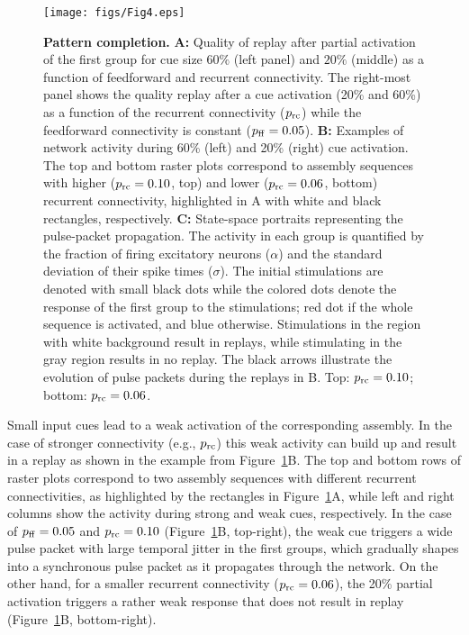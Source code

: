     \begin{figure}[!h]
      \texttt{[image: figs/Fig4.eps]}
      \caption{{\bf Pattern completion.}
        \textbf{A:} Quality of replay after partial activation of the first
        group for cue size $60\%$ (left panel) and $20\%$ (middle) as a
        function of feedforward and recurrent connectivity.  The right-most
        panel shows the quality replay after a cue activation (20\% and 60\%)
        as a function of the recurrent connectivity ($p_{\rm rc}$) while the
        feedforward connectivity is constant ($p_{\rm ff} = 0.05$).
        \textbf{B:} Examples of network activity during 60\% (left) and 20\%
        (right) cue activation.  The top and bottom raster plots correspond to
        assembly sequences with higher ($p_{\rm rc} = 0.10$, top) and lower
        ($p_{\rm rc} = 0.06$, bottom) recurrent connectivity, highlighted in A
        with white and black rectangles, respectively.
        \textbf{C:} State-space portraits representing the pulse-packet
        propagation.  The activity in each group is quantified by the fraction
        of firing excitatory neurons ($\alpha$) and the standard deviation of
        their spike times ($\sigma$).  The initial stimulations are denoted
        with small black dots while the colored dots denote the response of the
        first group to the stimulations; red dot if the whole sequence is
        activated, and blue otherwise.  Stimulations in the region with white
        background result in replays, while stimulating in the gray region
        results in no replay.  The black arrows illustrate the evolution of
        pulse packets during the replays in B.  Top: $p_{\rm rc} = 0.10$;
        bottom: $p_{\rm rc} = 0.06$.
          }
      \label{fig4}
    \end{figure}
    
    Small input cues lead to a weak activation of the corresponding assembly.
    In the case of stronger connectivity (e.g., $p_{\rm rc}$) this weak
    activity can build up and result in a replay as shown in the example from
    Figure~\ref{fig4}B. The top and bottom rows of raster plots correspond to two
    assembly sequences with different recurrent connectivities, as highlighted
    by the rectangles in Figure~\nolinebreak\ref{fig4}A, while left and right
    columns show the activity during strong and weak cues, respectively. In the
    case of $p_{\rm ff}=0.05$ and $p_{\rm rc}=0.10$ (Figure~\ref{fig4}B,
    top-right), the weak cue triggers a wide pulse packet with large temporal
    jitter in the first groups, which gradually shapes into a synchronous pulse
    packet as it propagates through the network. On the other hand, for a
    smaller recurrent connectivity ($p_{\rm rc}=0.06$), the 20\% partial
    activation triggers a rather weak response that does not result in replay
    (Figure~\ref{fig4}B, bottom-right).
    
